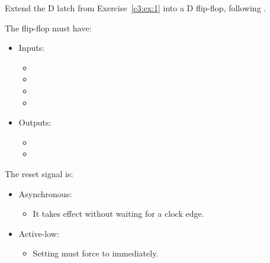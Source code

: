 \label{c3:set:2}

\label{c3:ex:2}
Extend the D latch from Exercise~\ref{c3:ex:1} into a D flip-flop, following .

The flip-flop must have:
\begin{itemize}
  \item Inputs:
    \begin{itemize}
      \item {}
      \item {}
      \item {}
      \item {}
    \end{itemize}
  \item Outputs:
    \begin{itemize}
      \item {}
      \item {}
    \end{itemize}
\end{itemize}
The reset signal is:
\begin{itemize}
  \item Asynchronous:
    \begin{itemize}
      \item It takes effect without waiting for a clock edge.
    \end{itemize}
  \item Active-low:
    \begin{itemize}
      \item Setting  must force  to  immediately.
    \end{itemize}
\end{itemize}
\note[Tip]
